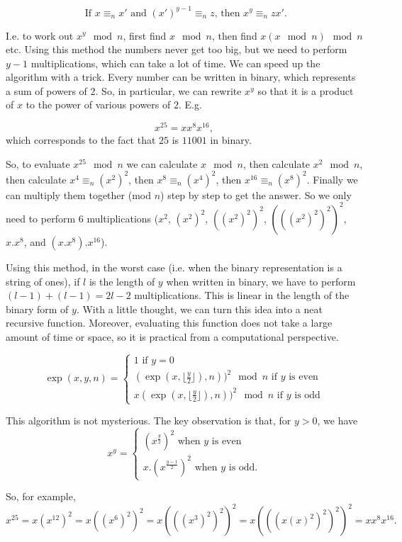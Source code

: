 \documentclass{article}
\theoremstyle{plain}
\begin{document}
\[\text{ If $x\equiv_n x'$ and $(x')^{y-1} \equiv_n z$, then $x^{y} \equiv_n zx'.$}\]

I.e. to work out $x^y \mod n$, first find $x \mod n$, then find $x(x\mod n) \mod n$ etc. Using this method the numbers never get too big, but we need to perform $y-1$ multiplications, which can take a lot of time. We can speed up the algorithm with a trick. Every number can be written in binary, which represents a sum of powers of 2. So, in particular, we can rewrite $x^y$ so that it is a product of $x$ to the power of various powers of $2$. E.g.

\[x^{25}=xx^8x^{16},\]  
which corresponds to the fact that $25$ is $11001$ in binary. 

So, to evaluate $x^{25}\mod n$ we can calculate $x\mod n$, then calculate $x^2\mod n$, then calculate $x^4 \equiv_n (x^2)^2$, then $x^8\equiv_n (x^4)^2$, then $x^{16}\equiv_n (x^8)^2$. Finally we can multiply them together (mod $n$) step by step to get the answer. So we only need to perform $6$ multiplications ($x^2$, $(x^2)^2$, $((x^2)^2)^2$, $(((x^2)^2)^2)^2$, $x.x^8$, and $(x.x^8).x^{16}$). 

Using this method, in the worst case (i.e. when the binary representation is a string of ones), if $l$ is the length of $y$ when written in binary, we have to perform $(l-1) + (l-1) = 2l-2$ multiplications. This is linear in the length of the binary form of $y$. With a little thought, we can turn this idea into a neat recursive function. Moreover, evaluating this function does not take a large amount of time or space, so it is practical from a computational perspective.

\[\exp(x,y,n) = \begin{cases}1 \text{ if } y=0 \\ (\exp(x,\lfloor \frac{y}{2} \rfloor), n))^2\mod n \text{ if $y$ is even} \\ x(\exp(x,\lfloor \frac{y}{2} \rfloor), n))^2\mod n \text{ if $y$ is odd} \end{cases}\]


This algorithm is not mysterious. The key observation is that, for $y>0$, we have 
\[x^y = \begin{cases}(x^{\frac{y}{2}})^2 \text{ when $y$ is even} \\ x.(x^{\frac{y-1}{2}})^2 \text{ when $y$ is odd}.  \end{cases}\]

So, for example, 
\[x^{25} = x(x^{12})^2 = x((x^6)^2)^2 = x(((x^3)^2)^2)^2 = x(((x(x)^2)^2)^2)^2 = xx^8x^{16}.\]
\end{document}
